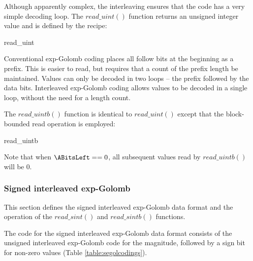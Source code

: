 Although apparently complex, the interleaving ensures that the code has a very simple decoding loop. 
The $read\_uint()$ function returns an unsigned integer value and is defined by the recipe:

\begin{pseudo}{read\_uint}{}
  \bsEND
\bsEND
{}
\end{pseudo}

\begin{informative}
Conventional exp-Golomb coding places all follow bits at the beginning as a prefix. This is
easier to read, but requires that a count of the prefix length be maintained. Values can only
be decoded in two loops -- the prefix followed by the data bits. Interleaved exp-Golomb 
coding allows values to be decoded in a single loop, without the need for a length count.
\end{informative}

The $read\_uintb()$ function is identical to $read\_uint()$ except that the block-bounded read
operation is employed:

\begin{pseudo}{read\_uintb}{}
  \bsEND
\bsEND
{}
\end{pseudo}

Note that when $\ABitsLeft==0$, all subsequent values read by $read\_uintb()$ will be 0.

\subsubsection{Signed interleaved exp-Golomb}
\label{segol}

This section defines the signed interleaved exp-Golomb data format and the operation
of the $read\_sint()$ and $read\_sintb()$ functions.

The code for the signed interleaved exp-Golomb data format consists of the
unsigned interleaved exp-Golomb code for the magnitude, followed by a sign bit
for non-zero values (Table \ref{table:segolcodings}).

